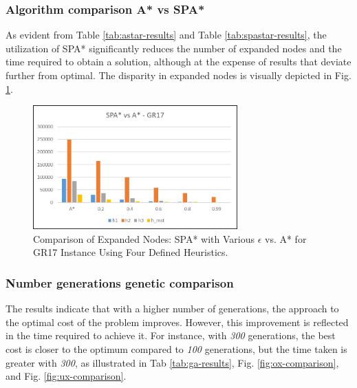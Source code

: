 \documentclass[runningheads]{llncs}
\begin{document}
\subsubsection{Algorithm comparison A* vs SPA*}
As evident from Table \ref{tab:astar-results} and Table \ref{tab:spastar-results}, the utilization of SPA* significantly reduces the number of expanded nodes and the time required to obtain a solution, although at the expense of results that deviate further from optimal. The disparity in expanded nodes is visually depicted in Fig. \ref{fig:astar-spastar-comparison}.
\begin{figure}[H]
  \centering
  \includegraphics[width=0.7\textwidth]{Graph A vs SPA.png} 
  \caption{Comparison of Expanded Nodes: SPA* with Various $\epsilon$ vs. A* for GR17 Instance Using Four Defined Heuristics.}
  \label{fig:astar-spastar-comparison}
\end{figure}
\subsubsection{Number generations genetic comparison} 
The results indicate that with a higher number of generations, the approach to the optimal cost of the problem improves. However, this improvement is reflected in the time required to achieve it. For instance, with \textit{300} generations, the best cost is closer to the optimum compared to \textit{100} generations, but the time taken is greater with \textit{300}, as illustrated in Tab \ref{tab:ga-results}, Fig. \ref{fig:ox-comparison}, and Fig. \ref{fig:ux-comparison}.
\end{document}
